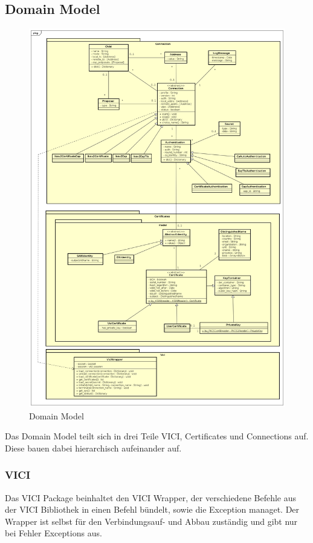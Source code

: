 \subsection{Domain Model}

\begin{figure}[H]
\centering
\includegraphics[width=440pt]{images/domain_model.png}
\caption[Domain Model]{Domain Model}
\end{figure}

Das Domain Model teilt sich in drei Teile VICI, Certificates und Connections auf. Diese bauen dabei hierarchisch aufeinander auf.

\subsubsection{VICI}
Das VICI Package beinhaltet den VICI Wrapper, der verschiedene Befehle aus der VICI Bibliothek in einen Befehl bündelt, sowie die Exception managet. Der Wrapper ist selbst für den Verbindungsauf- und Abbau zuständig und gibt nur bei Fehler Exceptions aus.

